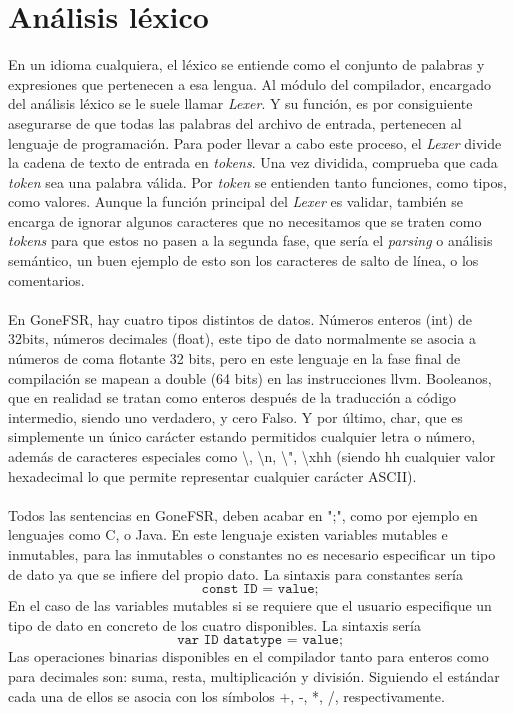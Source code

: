 \section{Análisis léxico}
En un idioma cualquiera,  el léxico se entiende como el conjunto de palabras y expresiones que pertenecen a esa lengua. Al módulo del compilador, encargado del análisis léxico se le suele llamar \textit{Lexer}. Y su función, es por consiguiente asegurarse de que todas las palabras del archivo de entrada, pertenecen al lenguaje de programación. Para poder llevar a cabo este proceso, el \textit{Lexer} divide la cadena de texto de entrada en \textit{tokens}. Una vez dividida, comprueba que cada \textit{token} sea una palabra válida. Por \textit{token} se entienden tanto funciones, como tipos, como valores. Aunque la función principal del \textit{Lexer} es validar, también se encarga de ignorar algunos caracteres que no necesitamos que se traten como \textit{tokens} para que estos no pasen a la segunda fase, que sería el \textit{parsing} o análisis semántico, un buen ejemplo de esto son los caracteres de salto de línea, o los comentarios.\\\\
En GoneFSR, hay cuatro tipos distintos de datos. Números enteros (int) de 32bits, números decimales (float), este tipo de dato normalmente se asocia a números de coma flotante 32 bits, pero en este lenguaje en la fase final de compilación se mapean a double (64 bits) en las instrucciones llvm. Booleanos, que en realidad se tratan como enteros después de la traducción a código intermedio, siendo uno verdadero, y cero Falso. Y por último, char, que es simplemente un único carácter estando permitidos cualquier letra o número, además de caracteres especiales como \textbackslash, \textbackslash n, \textbackslash ", \textbackslash xhh (siendo hh cualquier valor hexadecimal lo que permite representar cualquier carácter ASCII).\\\\
Todos las sentencias en GoneFSR, deben acabar en ";", como por ejemplo en lenguajes como C, o Java. En este lenguaje existen variables mutables e inmutables, para las inmutables o constantes no es necesario especificar un tipo de dato ya que se infiere del propio dato. La sintaxis para constantes sería
\[\texttt{const ID = value;}\]
En el caso de las variables mutables si se requiere que el usuario especifique un tipo de dato en concreto de los cuatro disponibles. La sintaxis sería
\[\texttt{var ID datatype = value;}\]
Las operaciones binarias disponibles en el compilador tanto para enteros como para decimales son: suma, resta, multiplicación y división. Siguiendo el estándar cada una de ellos se asocia con los símbolos +, -, *, /, respectivamente.\\\\
